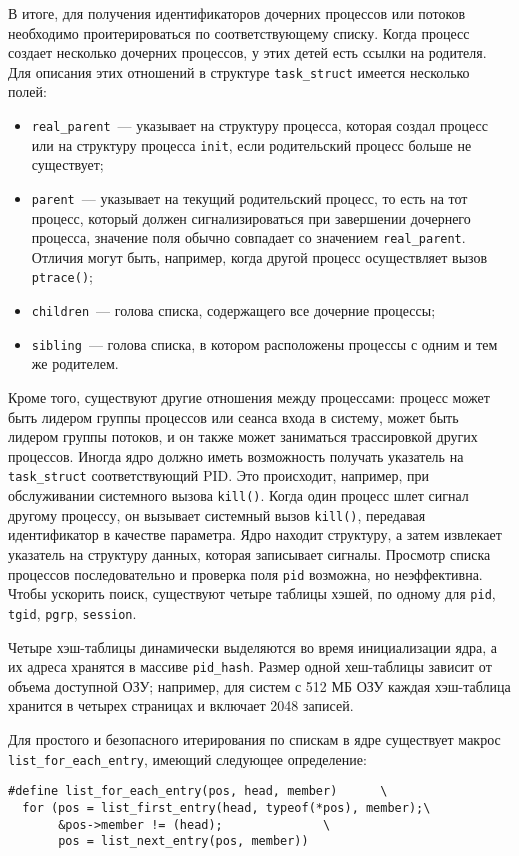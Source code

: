 В итоге, для получения идентификаторов дочерних процессов или потоков необходимо
проитерироваться по соответствующему списку. Когда процесс создает несколько
дочерних процессов, у этих детей есть ссылки на родителя. Для описания этих
отношений в структуре \texttt{task\_struct} имеется несколько полей:
\begin{itemize}
\item \texttt{real\_parent}~--- указывает на структуру процесса, которая создал
  процесс или на структуру процесса \texttt{init}, если родительский процесс
  больше не существует;
\item \texttt{parent}~--- указывает на текущий родительский процесс, то есть на
  тот процесс, который должен сигнализироваться при завершении дочернего
  процесса, значение поля обычно совпадает со значением \texttt{real\_parent}.
  Отличия могут быть, например, когда другой процесс осуществляет вызов
  \texttt{ptrace()};
\item \texttt{children}~--- голова списка, содержащего все дочерние процессы;
\item \texttt{sibling}~--- голова списка, в котором расположены процессы с одним
  и тем же родителем.
\end{itemize}

Кроме того, существуют другие отношения между процессами: процесс может быть
лидером группы процессов или сеанса входа в систему, может быть лидером группы
потоков, и он также может заниматься трассировкой других процессов. Иногда ядро
должно иметь возможность получать указатель на \texttt{task\_struct}
соответствующий PID. Это происходит, например, при обслуживании системного
вызова \texttt{kill()}. Когда один процесс шлет сигнал другому процессу, он
вызывает системный вызов \texttt{kill()}, передавая идентификатор в качестве
параметра. Ядро находит структуру, а затем извлекает указатель на структуру
данных, которая записывает сигналы. Просмотр списка процессов последовательно и
проверка поля \texttt{pid} возможна, но неэффективна. Чтобы ускорить поиск,
существуют четыре таблицы хэшей, по одному для \texttt{pid}, \texttt{tgid},
\texttt{pgrp}, \texttt{session}.

Четыре хэш-таблицы динамически выделяются во время инициализации ядра, а их
адреса хранятся в массиве \texttt{pid\_hash}. Размер одной хеш-таблицы зависит
от объема доступной ОЗУ; например, для систем с 512 МБ ОЗУ каждая хэш-таблица
хранится в четырех страницах и включает 2048 записей.

Для простого и безопасного итерирования по спискам в ядре существует макрос
\texttt{list\_for\_each\_entry}, имеющий следующее определение:
\medskip
\begin{lstlisting}[style=cstyle]
#define list_for_each_entry(pos, head, member)		\
  for (pos = list_first_entry(head, typeof(*pos), member);\
       &pos->member != (head);				\
       pos = list_next_entry(pos, member))
\end{lstlisting}
\medskip

